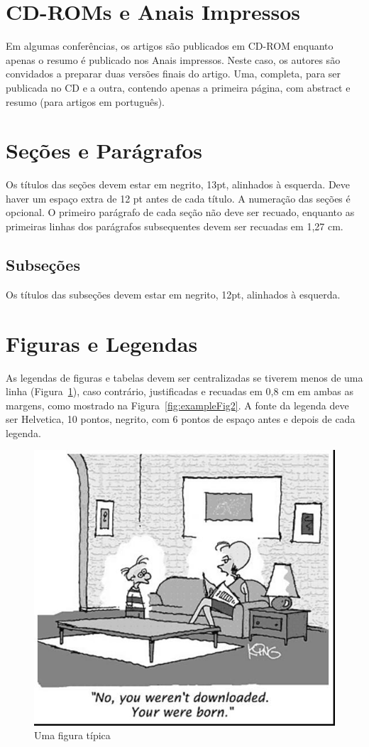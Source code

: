 \documentclass[12pt]{article}
\begin{document}
\section{CD-ROMs e Anais Impressos}

Em algumas conferências, os artigos são publicados em CD-ROM enquanto apenas o
resumo é publicado nos Anais impressos. Neste caso, os autores são
convidados a preparar duas versões finais do artigo. Uma, completa, para ser
publicada no CD e a outra, contendo apenas a primeira página, com
abstract e resumo (para artigos em português).

\section{Seções e Parágrafos}

Os títulos das seções devem estar em negrito, 13pt, alinhados à esquerda. Deve haver um espaço extra
de 12 pt antes de cada título. A numeração das seções é opcional. O primeiro
parágrafo de cada seção não deve ser recuado, enquanto as primeiras linhas dos
parágrafos subsequentes devem ser recuadas em 1,27 cm.

\subsection{Subseções}

Os títulos das subseções devem estar em negrito, 12pt, alinhados à esquerda.

\section{Figuras e Legendas}\label{sec:figs}


As legendas de figuras e tabelas devem ser centralizadas se tiverem menos de uma linha
(Figura~\ref{fig:exampleFig1}), caso contrário, justificadas e recuadas em 0,8 cm em
ambas as margens, como mostrado na Figura~\ref{fig:exampleFig2}. A fonte da legenda deve
ser Helvetica, 10 pontos, negrito, com 6 pontos de espaço antes e depois de cada
legenda.

\begin{figure}[ht]
\centering
\includegraphics[width=.5\textwidth]{fig1.jpg}
\caption{Uma figura típica}
\label{fig:exampleFig1}
\end{figure}
\end{document}
